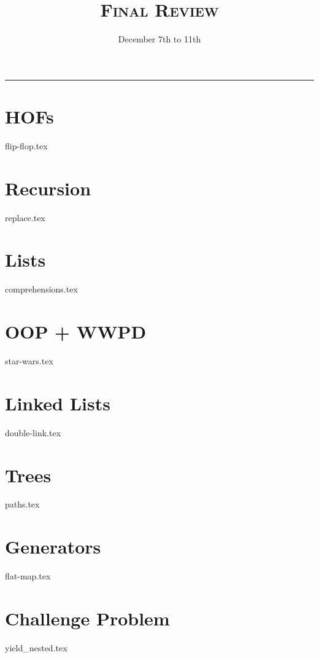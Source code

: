 \documentclass{exam}
\title{\textsc{Final Review}}
\date{December 7th to 11th}
\begin{document}
\maketitle
\rule{\textwidth}{0.15em}
\fontsize{12}{15}\selectfont


\begin{questions}

\section{HOFs}
{flip-flop.tex}
\newpage

\section{Recursion}
{replace.tex}
\newpage

\section{Lists}
{comprehensions.tex}
\newpage

\section{OOP + WWPD}
{star-wars.tex}
\newpage

\section{Linked Lists}
{double-link.tex}
\newpage

\section{Trees}
{paths.tex}
\newpage

\section{Generators}
{flat-map.tex}
\newpage
\section{Challenge Problem}
{yield_nested.tex}
\newpage 
\end{questions}
\end{document}

